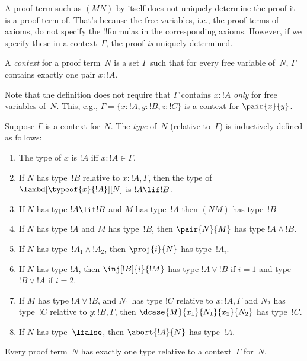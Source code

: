 \documentclass[../../../include/open-logic-section]{subfiles}
\begin{document}


A proof term such as $(MN)$ by itself does not uniquely determine the
proof it is a proof term of. That's because the free variables, i.e.,
the proof terms of axioms, do not specify the !!{formula}s in the
corresponding axioms. However, if we specify these in a
context~$\Gamma$, the proof \emph{is} uniquely determined.

\begin{defn}
A \emph{context} for a proof term~$N$ is a set $\Gamma$ such that for
every free variable of~$N$, $\Gamma$ contains exactly one pair $x : !A$.
\end{defn}

Note that the definition does not require that $\Gamma$ contains
$x:!A$ \emph{only} for free variables of~$N$. This, e.g., $\Gamma =
\{x:!A, y:!B, z:!C\}$ is a context for $\pair{x}{y}$.

\begin{defn}
  Suppose $\Gamma$ is a context for~$N$. The \emph{type} of~$N$
  (relative to~$\Gamma$) is inductively defined as follows:
  \begin{enumerate}
  \item The type of $x$ is $!A$ iff $x:!A \in \Gamma$.
  \item If $N$ has type~$!B$ relative to $x:!A, \Gamma$, then the type of $\lambd[\typeof{x}{!A}][N]$ is $!A \lif !B$.
  \item If $N$ has type $!A \lif !B$ and $M$ has type~$!A$ then $(NM)$
  has type~$!B$
  \item If $N$ has type $!A$ and $M$ has type~$!B$, then $\pair{N}{M}$
  has type $!A \land !B$.
  \item If $N$ has type~$!A_1 \land !A_2$, then $\proj{i}{N}$ has type~$!A_i$.
  \item If $N$ has type $!A$, then
    $\inj[!B]{i}{!M}$ has type $!A \lor !B$ if $i=1$ and type $!B \lor
    !A$ if $i=2$.
  \item If $M$ has type $!A \lor !B$, and $N_1$ has type $!C$ relative
  to $x:!A, \Gamma$ and $N_2$ has type~$!C$ relative to $y:!B,
  \Gamma$, then $\dcase{M}{x_1}{N_1}{x_2}{N_2}$ has type~$!C$.
  \item If $N$ has type~$\lfalse$, then
    $\abort{!A}{N}$ has type~$!A$.
  \end{enumerate}
\end{defn}

\begin{prop}
Every proof term~$N$ has exactly one type relative to a
context~$\Gamma$ for~$N$.
\end{prop}
\end{document}
